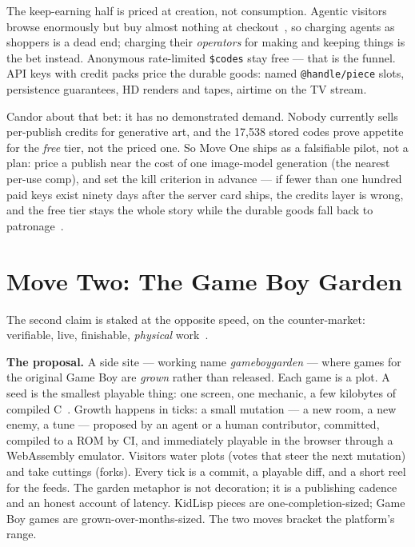 \documentclass[10pt,letterpaper,twocolumn]{article}
\begin{document}
The keep-earning half is priced at creation, not consumption. Agentic visitors browse enormously but buy almost nothing at checkout~\citep{humansec2026agentic}, so charging agents as shoppers is a dead end; charging their \emph{operators} for making and keeping things is the bet instead. Anonymous rate-limited \texttt{\$codes} stay free --- that is the funnel. API keys with credit packs price the durable goods: named \texttt{@handle/piece} slots, persistence guarantees, HD renders and tapes, airtime on the TV stream.

Candor about that bet: it has no demonstrated demand. Nobody currently sells per-publish credits for generative art, and the 17{,}538 stored codes prove appetite for the \emph{free} tier, not the priced one. So Move One ships as a falsifiable pilot, not a plan: price a publish near the cost of one image-model generation (the nearest per-use comp), and set the kill criterion in advance --- if fewer than one hundred paid keys exist ninety days after the server card ships, the credits layer is wrong, and the free tier stays the whole story while the durable goods fall back to patronage~\citep{scudder2026sustainability}.

\section{Move Two: The Game Boy Garden}

The second claim is staked at the opposite speed, on the counter-market: verifiable, live, finishable, \emph{physical} work~\citep{authorsguild2026humanauthored,npr2026cert}.

\textbf{The proposal.} A side site --- working name \emph{gameboygarden} --- where games for the original Game Boy are \emph{grown} rather than released. Each game is a plot. A seed is the smallest playable thing: one screen, one mechanic, a few kilobytes of compiled C~\citep{gbdk2020}. Growth happens in ticks: a small mutation --- a new room, a new enemy, a tune --- proposed by an agent or a human contributor, committed, compiled to a ROM by CI, and immediately playable in the browser through a WebAssembly emulator. Visitors water plots (votes that steer the next mutation) and take cuttings (forks). Every tick is a commit, a playable diff, and a short reel for the feeds. The garden metaphor is not decoration; it is a publishing cadence and an honest account of latency. KidLisp pieces are one-completion-sized; Game Boy games are grown-over-months-sized. The two moves bracket the platform's range.
\end{document}
